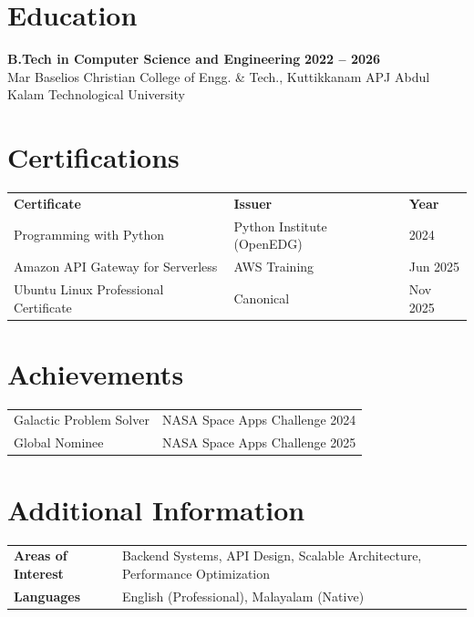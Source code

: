 \documentclass[10pt, a4paper]{article}
\begin{document}
\section*{Education}

\textbf{B.Tech in Computer Science and Engineering} \hfill \textbf{2022 -- 2026}\\
Mar Baselios Christian College of Engg. \& Tech., Kuttikkanam \hfill APJ Abdul Kalam Technological University

\section*{Certifications}

\renewcommand{\arraystretch}{1.0}
\begin{tabular}{@{} p{7.8cm} p{6.5cm} p{2.5cm} @{}}
\textbf{Certificate}                  & \textbf{Issuer}              & \textbf{Year} \\[1pt]
Programming with Python               & Python Institute (OpenEDG)   & 2024 \\
Amazon API Gateway for Serverless     & AWS Training                 & Jun 2025 \\
Ubuntu Linux Professional Certificate & Canonical                    & Nov 2025 \\
\end{tabular}

\section*{Achievements}

\begin{tabular}{@{} p{9.5cm} p{8cm} @{}}
Galactic Problem Solver              & NASA Space Apps Challenge 2024 \\
Global Nominee                       & NASA Space Apps Challenge 2025 \\
\end{tabular}

\section*{Additional Information}

\begin{tabular}{@{} >{\bfseries}p{3.8cm} p{13cm} @{}}
Areas of Interest & Backend Systems, API Design, Scalable Architecture, Performance Optimization \\
Languages         & English (Professional), Malayalam (Native) \\
\end{tabular}
\end{document}
